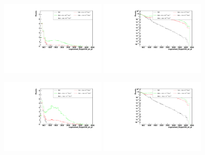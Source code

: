 \begin{figure}[h]
  \begin{center}
	\includegraphics[width=0.45\textwidth]{Plots/aQGC_kinematics/ungroomed_PuppiAK8_jet_pt_FM0.pdf}%
	\includegraphics[width=0.45\textwidth]{Plots/aQGC_kinematics/ungroomed_PuppiAK8_jet_pt_FM0_log.pdf}\\		
    \caption{}
  \end{center}
\end{figure}
\begin{figure}[h]
  \begin{center}
	\includegraphics[width=0.45\textwidth]{Plots/aQGC_kinematics/ungroomed_PuppiAK8_jet_pt_FM1.pdf}%
	\includegraphics[width=0.45\textwidth]{Plots/aQGC_kinematics/ungroomed_PuppiAK8_jet_pt_FM1_log.pdf}\\		
    \caption{}
  \end{center}
\end{figure}
